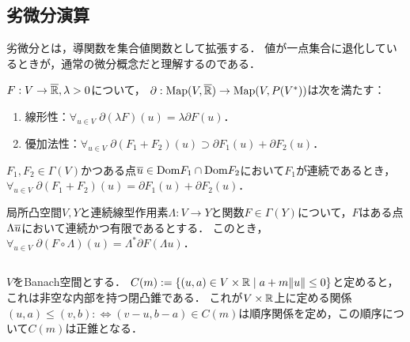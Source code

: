 \documentclass[uplatex,dvipdfmx]{jsreport}
\begin{document}
\subsection{劣微分演算}

\begin{tcolorbox}[colframe=ForestGreen, colback=ForestGreen!10!white,breakable,colbacktitle=ForestGreen!40!white,coltitle=black,fonttitle=\bfseries\sffamily,
title=]
    劣微分とは，導関数を集合値関数として拡張する．
    値が一点集合に退化しているときが，通常の微分概念だと理解するのである．
\end{tcolorbox}

\begin{lemma}
    $F:V\to\overline{\mathbb{R}},\lambda>0$について，
    $\partial:\mathrm{Map}(V,\overline{\mathbb{R}})\to\mathrm{Map}(V,P(V^*))$は次を満たす：
    \begin{enumerate}
        \item 線形性：$\forall_{u\in V}\;\partial(\lambda F)(u)=\lambda \partial F(u)$．
        \item 優加法性：$\forall_{u\in V}\;\partial(F_1+F_2)(u)\supset\partial F_1(u)+\partial F_2(u)$．
    \end{enumerate}
\end{lemma}

\begin{proposition}[等号成立十分条件]
    $F_1,F_2\in\Gamma(V)$かつある点$\overline{u}\in\mathrm{Dom} F_1\cap\mathrm{Dom} F_2$において$F_1$が連続であるとき，$\forall_{u\in V}\;\partial(F_1+F_2)(u)=\partial F_1(u)+\partial F_2(u)$．
\end{proposition}

\begin{proposition}
    局所凸空間$V,Y$と連続線型作用素$\Lambda:V\to Y$と関数$F\in\Gamma(Y)$について，$F$はある点$\Lambda\overline{u}$において連続かつ有限であるとする．
    このとき，$\forall_{u\in V}\;\partial(F\circ\Lambda)(u)=\Lambda^*\partial F(\Lambda u)$．
\end{proposition}

\subsection{}

\begin{notation}
    $V$をBanach空間とする．
    $C(m):=\left\{(u,a)\in V\times\mathbb{R}\mid a+m\|u\|\le 0\right\}$と定めると，これは非空な内部を持つ閉凸錐である．
    これが$V\times\mathbb{R}$上に定める関係$(u,a)\le(v,b):\Leftrightarrow(v-u,b-a)\in C(m)$は順序関係を定め，この順序について$C(m)$は正錐となる．
\end{notation}
\end{document}
